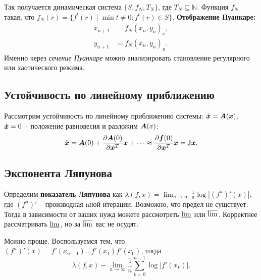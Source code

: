 Так получается динамическая система $\{S, f_N, T_N\}$, где 
$T_N \subseteq \mathbb{N}$.  Функция $f_N$ такая, что 
$f_N(r) = \{f^t(r) \mid \min t \neq 0 : f^t(r) \in S  \}$. \textbf{Отображение Пуанкаре:}
\begin{align*}
    x_{n+1} &= f_N(x_n, y_n)_x, \\
    y_{n+1} &= f_N(x_n, y_n)_y.
\end{align*}
Именно через \textit{сечение Пуанкаре} можно анализировать становление регулярного или хаотического режима. 


\subsection{Устойчивость по линейному приближению}
Рассмотрим устойчивость по линейному приближению системы: $\dot{\mbox{\boldmath $x$}} = \mbox{\boldmath $A$}(\mbox{\boldmath $x$})$, $\dot{\mbox{\boldmath $x$}} = 0$ -- положение равновесия и разложим $\mbox{\boldmath $A$}(x)$:
\begin{equation}
    \dot{\mbox{\boldmath $x$}} = \mbox{\boldmath $A$}(0) + \dfrac{\partial \mbox{\boldmath $A$}(0)}{\partial \mbox{\boldmath $x$}^T} \mbox{\boldmath $x$} + \dots \approx \dfrac{\partial \mbox{\boldmath $f$}(0)}{\partial \mbox{\boldmath $x$}^T} \mbox{\boldmath $x$} = \mathbb{J} \mbox{\boldmath $x$}.
\end{equation}


\subsection{Экспонента Ляпунова}
Определим \textbf{показатель Ляпунова} как 
    $\lambda (f, x) = \lim_{n \to \infty} \frac{1}{n} \log{|(f^n)' (x)|},$
где $(f^n)'$ -- производная nной итерации. Возможно, что предел не сущствует. Тогда в зависимости от ваших нужд можете рассмотреть $\varliminf$ или $\varlimsup$. Корректнее рассматривать $\varliminf$, но за $\varlimsup$ вас не осудят.

Можно проще. Воспользуемся тем, что 
$(f^n)'(x) = f'(x_{n-1}) \dots f'(x_1) f'(x_0)$, тогда
\begin{equation}
    \boxed{\lambda (f, x) - \lim_{n \to \infty} \frac{1}{n} \sum_{k=0}^{n-1} \log |f'(x_k)|.} 
\end{equation}
